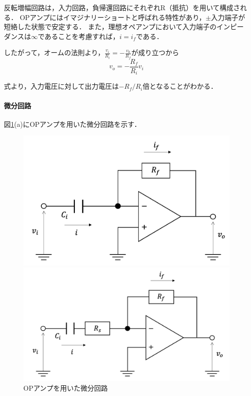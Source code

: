 \documentclass[dvipdfmx,titlepage,a4j]{jsarticle}  %
\begin{document}
反転増幅回路は，入力回路，負帰還回路にそれぞれR（抵抗）を用いて構成される．
OPアンプにはイマジナリーショートと呼ばれる特性があり，$\pm$入力端子が短絡した状態で安定する．
また，理想オペアンプにおいて入力端子のインピーダンスは$\infty$であることを考慮すれば，$i = i_f$である．

したがって，オームの法則より，$\frac{v_i}{R_i} = -\frac{v_0}{R_f}$が成り立つから
\begin{equation}
  v_{o} = -\frac{R_f}{R_i}v_i
\end{equation}

式より，入力電圧に対して出力電圧は$-R_f/R_i$倍となることがわかる．

\paragraph{微分回路\\}
図\ref{fig:di:case2}(a)にOPアンプを用いた微分回路を示す．
\begin{figure}[H]
  \centering
  \begin{minipage}{8cm}
    \centering
    \includegraphics[keepaspectratio, scale=0.2]{../image/di-case21.png}
  \end{minipage}
  \begin{minipage}{8cm}
    \centering
    \includegraphics[keepaspectratio, scale=0.2]{../image/di-case22.png}
  \end{minipage}
  \caption{OPアンプを用いた微分回路}
  \label{fig:di:case2}
\end{figure}
\end{document}
